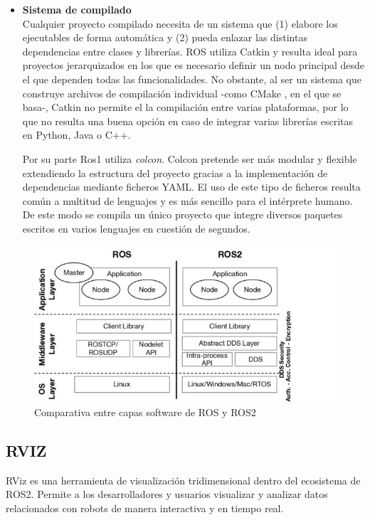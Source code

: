 \begin{itemize}
    \item \textbf{Sistema de compilado}\\
    Cualquier proyecto compilado necesita de un sistema que (1) elabore los ejecutables de forma automática y (2) pueda enlazar las distintas dependencias entre clases y librerías. ROS utiliza Catkin y resulta ideal para proyectos jerarquizados en los que es necesario definir un nodo principal desde el que dependen todas las funcionalidades. No obstante, al ser un sistema que construye archivos de compilación individual -como CMake \cite{documentacion_CMake}, en el que se basa-, Catkin no permite el la compilación entre varias plataformas, por lo que no resulta una buena opción en caso de integrar varias librerías escritas en Python, Java o C++.

    Por su parte Ros1 utiliza \textit{colcon}. Colcon pretende ser más modular y flexible extendiendo la estructura del proyecto gracias a la implementación de dependencias mediante ficheros \acrshort{YAML}. El uso de este tipo de ficheros resulta común a multitud de lenguajes y es más sencillo para el intérprete humano. De este modo se compila un único proyecto que integre diversos paquetes escritos en varios lenguajes en cuestión de segundos.
\end{itemize}

\begin{figure}[h!]
    \centering
    \includegraphics[scale=1.25]{figuras/Comparacion_ros_ros2.jpg}
    \caption{Comparativa entre capas software de ROS y ROS2 \cite{Mazzeo_2020}}
    \label{fig:Comparacion_ros_ros2}
\end{figure}


\subsection{RVIZ}
RViz \cite{guia_RViz} es una herramienta de visualización tridimensional dentro del ecosistema de ROS2. Permite a los desarrolladores y usuarios visualizar y analizar datos relacionados con robots de manera interactiva y en tiempo real. 

